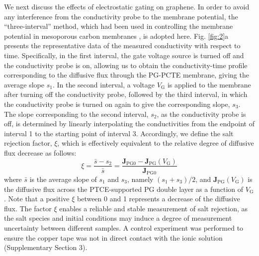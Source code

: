\documentclass[journal=langd5,email=true, hyperref=true, keywords=false]{achemso}
\newcommand{\Fig}{Fig.}
\begin{document}
We next discuss the effects of electrostatic gating on graphene. In
order to avoid any interference from the conductivity probe to the
membrane potential, the “three-interval” method, which had been used
in controlling the membrane potential in mesoporous carbon membranes
\cite{Surwade_2014}, is adopted here. \Fig{} \ref{fig:2}a presents the
representative data of the measured conductivity with respect to
time. Specifically, in the first interval, the gate voltage source is
turned off and the conductivity probe is on, allowing us to obtain the
conductivity-time profile corresponding to the diffusive flux through
the PG-PCTE membrane, giving the average slope $s_{1}$. In the second
interval, a voltage $V_{\mathrm{G}}$ is applied to the membrane after
turning off the conductivity probe, followed by the third interval, in
which the conductivity probe is turned on again to give the
corresponding slope, $s_{3}$. The slope corresponding to the second
interval, $s_{2}$, as the conductivity probe is off, is determined by
linearly interpolating the conductivities from the endpoint of
interval 1 to the starting point of interval 3. Accordingly, we define
the salt rejection factor, $\xi$, which is effectively equivalent to
the relative degree of diffusive flux decrease as follows:
\begin{equation}
  \label{eq:rejection}
  \xi = \frac{\bar{s} - s_{2}}{\bar{s}} = \frac{\boldsymbol{J}_{\mathrm{PG0}}
    - \boldsymbol{J}_{\mathrm{PG}}(V_{\mathrm{G}})}{\boldsymbol{J}_{\mathrm{PG0}}}
\end{equation}
where $\bar{s}$ is the average slope of $s_{1}$ and $s_{3}$, namely
$(s_{1} + s_{3})/2$, and
$\boldsymbol{J}_{\mathrm{PG}}(V_{\mathrm{G}})$ is the diffusive flux
across the PTCE-supported PG double layer as a function of
$V_{\mathrm{G}}$. Note that a positive $\xi$ between 0 and 1
represents a decrease of the diffusive flux. The factor $\xi$ enables
a reliable and stable measurement of salt rejection, as the salt
species and initial conditions may induce a degree of measurement
uncertainty between different samples. A control experiment was
performed to ensure the copper tape was not in direct contact with the
ionic solution (Supplementary Section 3).
\end{document}
